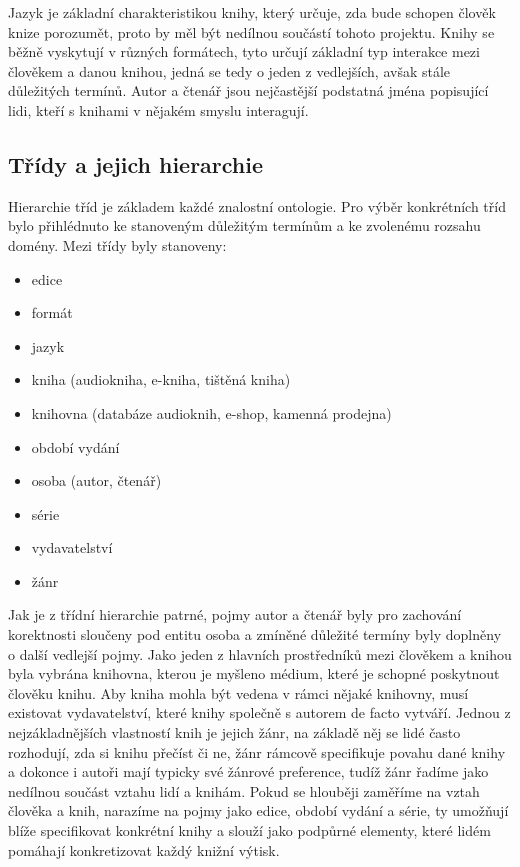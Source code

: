 \documentclass[a4paper,oneside,11pt,usenames,dvipsnames]{article}
\begin{document}
Jazyk je základní charakteristikou knihy, který určuje, zda bude schopen člověk knize porozumět, proto by měl být nedílnou součástí tohoto projektu. Knihy se běžně vyskytují v různých formátech, tyto určují základní typ interakce mezi člověkem a danou knihou, jedná se tedy o jeden z vedlejších, avšak stále důležitých termínů. Autor a čtenář jsou nejčastější podstatná jména popisující lidi, kteří s knihami v nějakém smyslu interagují. 



\subsection{Třídy a jejich hierarchie}
Hierarchie tříd je základem každé znalostní ontologie. Pro výběr konkrétních tříd bylo přihlédnuto ke stanoveným důležitým termínům a ke zvolenému rozsahu domény. Mezi třídy byly stanoveny:
\begin{itemize}
    \item edice
    \item formát
    \item jazyk
    \item kniha (audiokniha, e-kniha, tištěná kniha)
    \item knihovna (databáze audioknih, e-shop, kamenná prodejna)
    \item období vydání
    \item osoba (autor, čtenář)
    \item série
    \item vydavatelství
    \item žánr
\end{itemize}
Jak je z třídní hierarchie patrné, pojmy autor a čtenář byly pro zachování korektnosti sloučeny pod entitu osoba a zmíněné důležité termíny byly doplněny o další vedlejší pojmy.
Jako jeden z hlavních prostředníků mezi člověkem a knihou byla vybrána knihovna, kterou je myšleno médium, které je schopné poskytnout člověku knihu. Aby kniha mohla být vedena v rámci nějaké knihovny, musí existovat vydavatelství, které knihy společně s autorem de facto vytváří. 
Jednou z nejzákladnějších vlastností knih je jejich žánr, na základě něj se lidé často rozhodují, zda si knihu přečíst či ne, žánr rámcově specifikuje povahu dané knihy a dokonce i autoři mají typicky své žánrové preference, tudíž žánr řadíme jako nedílnou součást vztahu lidí a knihám.
Pokud se hlouběji zaměříme na vztah člověka a knih, narazíme na pojmy jako edice, období vydání a série, ty umožňují blíže specifikovat konkrétní knihy a slouží jako podpůrné elementy, které lidém pomáhají konkretizovat každý knižní výtisk. 
\end{document}
